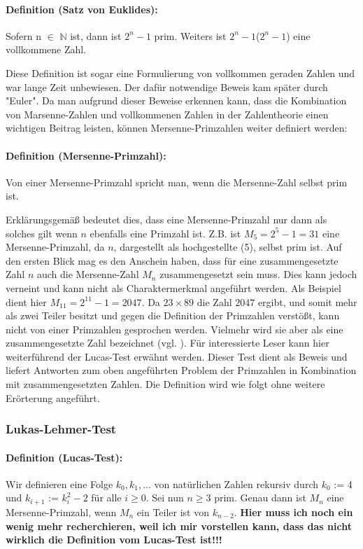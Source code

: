 \documentclass[12pt,a4paper]{article}
\theoremstyle{definition}
\begin{document}
\paragraph{Definition (Satz von Euklides):}
Sofern n $\in$ $\mathbb{N}$ ist, dann ist $2^{n}-1$ prim.
Weiters ist $2^{n}-1$($2^{n}-1$) eine vollkommene Zahl.

Diese Definition ist sogar eine Formulierung von vollkommen geraden Zahlen und war lange Zeit unbewiesen.
Der dafür notwendige Beweis kam später durch "{Euler}".
Da man aufgrund dieser Beweise erkennen kann, dass die Kombination von Marsenne-Zahlen und vollkommenen Zahlen in der Zahlentheorie einen wichtigen Beitrag leisten, können Mersenne-Primzahlen weiter definiert werden:
\paragraph{Definition (Mersenne-Primzahl):}
Von einer Mersenne-Primzahl spricht man, wenn die Mersenne-Zahl selbst prim ist.

Erklärungsgemäß bedeutet dies, dass eine Mersenne-Primzahl nur dann als solches gilt wenn $n$ ebenfalls eine Primzahl ist.
Z.B. ist $M_5 = 2^{5}-1 = 31$ eine Mersenne-Primzahl, da $n$, dargestellt als hochgestellte (5), selbst prim ist.
Auf den ersten Blick mag es den Anschein haben, dass für eine zusammengesetzte Zahl $n$ auch die Mersenne-Zahl $M_n$ zusammengesetzt sein muss.
Dies kann jedoch verneint und kann nicht als Charaktermerkmal angeführt werden. Als Beispiel dient hier $M_{11} = 2^{11}-1 = 2047$.
Da $23 \times 89$ die Zahl $2047$ ergibt, und somit mehr als zwei Teiler besitzt und gegen die Definition der Primzahlen verstößt, kann nicht von einer Primzahlen gesprochen werden.
Vielmehr wird sie aber als eine zusammengesetzte Zahl bezeichnet (vgl. \cite[168--169]{RempeGillen2009}).\newline
Für interessierte Leser kann hier weiterführend der Lucas-Test erwähnt werden.
Dieser Test dient als Beweis und liefert Antworten zum oben angeführten Problem der Primzahlen in Kombination mit zusammengesetzten Zahlen.
Die Definition wird wie folgt ohne weitere Erörterung angeführt.

\subsubsection{Lukas-Lehmer-Test}
\paragraph{Definition (Lucas-Test):}\label{Definition (Lucas-Test)}
Wir definieren eine Folge $k_0,k_1,...$ von natürlichen Zahlen rekursiv durch $k_0$ := 4 und $k_{i+1}$ := $k_i^2-2$ für alle $i\geq 0$.
\newline Sei nun $n\geq 3$ prim. Genau dann ist $M_n$ eine Mersenne-Primzahl, wenn $M_n$ ein Teiler ist von $k_{n-2}$.
\textbf{Hier muss ich noch ein wenig mehr recherchieren, weil ich mir vorstellen kann, dass das nicht wirklich die Definition vom Lucas-Test ist!!!}
\end{document}
